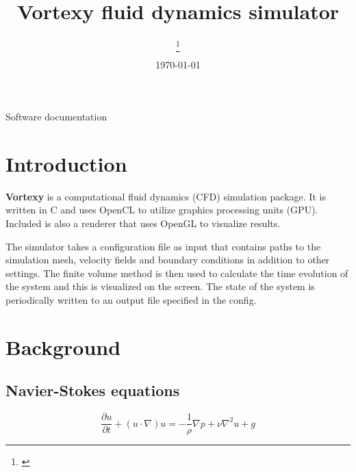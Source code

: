 \documentclass[12pt]{article}
\title {
  Vortexy fluid dynamics simulator
}
\date{\today}
\author[1] {
  \firstauth\thanks{\href{mailto: \email}{\email}}
}
\begin{document}
\setlength{\belowcaptionskip}{10pt}


\normalsize

\begin{titlingpage}
  \maketitle

  \begin{center}
    Software documentation
  \end{center}
\end{titlingpage}

\newpage

\tableofcontents

\newpage

\section{Introduction}

{\bf Vortexy} is a computational fluid dynamics (CFD) simulation package. It is written in C and uses OpenCL to utilize graphics processing units (GPU). Included is also a renderer that uses OpenGL to visualize results.

The simulator takes a configuration file as input that contains paths to the simulation mesh, velocity fields and boundary conditions in addition to other settings. The finite volume method is then used to calculate the time evolution of the system and this is visualized on the screen. The state of the system is periodically written to an output file specified in the config.


\section{Background}

\subsection{Navier-Stokes equations}

\begin{equation}
  \frac{\partial u}{\partial t} + (u \cdot \nabla) u = -\frac{1}{\rho} \nabla p + \nu \nabla^2 u + g
\end{equation}
\end{document}
